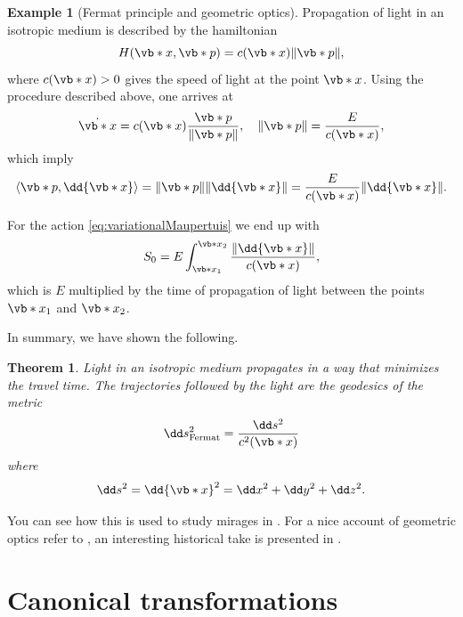 \documentclass[english,fontsize=11pt,paper=b5]{scrbook}
\newtheorem{theorem}{Theorem}[chapter]
\theoremstyle{definition}
\newtheorem{example}{Example}[chapter]
\begin{document}
    \begin{example}[Fermat principle and geometric optics]
      Propagation of light in an isotropic medium is described by the hamiltonian
      \begin{equation}
        H(\vb*{x}, \vb*{p}) = c(\vb*{x}) \|\vb*{p}\|,
      \end{equation}
      where $c(\vb*{x}) > 0$ gives the speed of light at the point $\vb*{x}$.
      Using the procedure described above, one arrives at
      \begin{equation}
        \dot{\vb*{x}} = c(\vb*{x})\frac{\vb*{p}}{\|\vb*{p}\|}, \quad
        \|\vb*{p}\| = \frac{E}{c(\vb*{x})},
      \end{equation}
      which imply
      \begin{equation}
        \langle\vb*{p}, \dd{\vb*{x}}\rangle = \|\vb*{p}\|\|\dd{\vb*{x}}\| = \frac{E}{c(\vb*{x})}\|\dd{\vb*{x}}\|.
      \end{equation}

      For the action \eqref{eq:variationalMaupertuis} we end up with
      \begin{equation}
        S_0 = E \int_{\vb*{x}_1}^{\vb*{x}_2} \frac{\|\dd{\vb*{x}}\|}{c(\vb*{x})},
      \end{equation}
      which is $E$ multiplied by the time of propagation of light between the points $\vb*{x}_1$ and $\vb*{x}_2$.

      In summary, we have shown the following.
      \begin{theorem}
        Light in an isotropic medium propagates in a way that minimizes the travel time.
        The trajectories followed by the light are the geodesics of the metric
        \begin{equation}
          \dd s^2_{\mathrm{Fermat}} = \frac{\dd s^2}{c^2(\vb*{x})}
        \end{equation}
        where
        \begin{equation}
          \dd s^2 = \dd{\vb*{x}}^2 = \dd x^2 + \dd y^2 + \dd z^2.
        \end{equation}
      \end{theorem}

      You can see how this is used to study mirages in \cite[Example 8.34]{book:knauf}.
      For a nice account of geometric optics refer to \cite[Chapter 8.7]{book:knauf}, an interesting historical take is presented in \cite{book:broer}.
    \end{example}

    \section{Canonical transformations}
\end{document}
